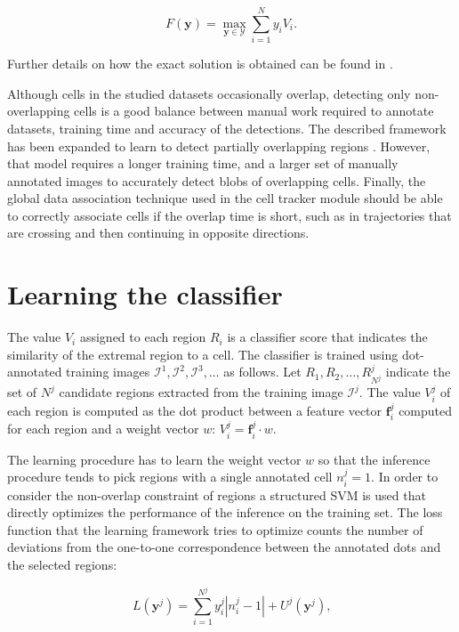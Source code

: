 	\[
		F(\textbf{y}) = \max_{\textbf{y} \in \mathcal{Y}} \sum_{i=1}^N y_i V_i \text{.}
	\]
	
	Further details on how the exact solution is obtained can be found in \cite{arteta12}.
	
	Although cells in the studied datasets occasionally overlap, detecting only non-overlapping cells is a good balance between manual work required to annotate datasets, training time and accuracy of the detections. The described framework has been expanded to learn to detect partially overlapping regions \cite{arteta13}. However, that model requires a longer training time, and a larger set of manually annotated images to accurately detect blobs of overlapping cells. Finally, the global data association technique used in the cell tracker module should be able to correctly associate cells if the overlap time is short, such as in trajectories that are crossing and then continuing in opposite directions.
	
	
	\section{Learning the classifier \statusfirstdraft}
	\label{sec:detector_classifier}
	
	The value $V_i$ assigned to each region $R_i$ is a classifier score that indicates the similarity of the extremal region to a cell. The classifier is trained using dot-annotated training images $\mathcal{I}^1, \mathcal{I}^2, \mathcal{I}^3, \dots$ as follows. Let $R_1, R_2,\dots,R_{N^j}^j$ indicate the set of $N^j$ candidate regions extracted from the training image $\mathcal{I}^j$. The value $V_i^j$ of each region is computed as the dot product between a feature vector $\textbf{f}_i^j$ computed for each region and a weight vector $w$: $V_i^j = \textbf{f}_i^j \cdot w$.
	
	The learning procedure has to learn the weight vector $w$ so that the inference procedure tends to pick regions with a single annotated cell $n_i^j = 1$. In order to consider the non-overlap constraint of regions a structured SVM \cite{tso04} is used that directly optimizes the performance of the inference on the training set. The loss function that the learning framework tries to optimize counts the number of deviations from the one-to-one correspondence between the annotated dots and the selected regions:
	
	\[
		L(\textbf{y}^j) = \sum_{i=1}^{N^j} y_i^j |n_i^j - 1| + U^j(\textbf{y}^j)\text{,}
	\]
	
